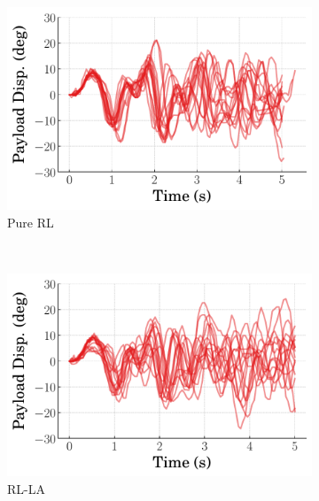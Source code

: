 %
\begin{figure}[tb]
    \centering
    \begin{subfigure}[b]{0.49\textwidth}
        \centering
        \includegraphics[width=\textwidth]{figures/figures_RL_model_based_control/time_responses_crane_experiments/pure_RL_payload_experiment.pdf}
        \caption{Pure RL}
        \label{subfig_chap2:dpcrane_experiment_payload_pure_RL}
    \end{subfigure}\\
    \hfill
    \begin{subfigure}[b]{0.49\textwidth}
	    \centering
	    \includegraphics[width=\textwidth]{figures/figures_RL_model_based_control/time_responses_crane_experiments/RL-LA_payload_experiment.pdf}
	    \caption{RL-LA}
	    \label{subfig_chap2:dpcrane_experiment_payload_RL_LA}
    \end{subfigure}
    \hfill
    \begin{subfigure}[b]{0.49\textwidth}

\end{subfigure}
\end{figure}
